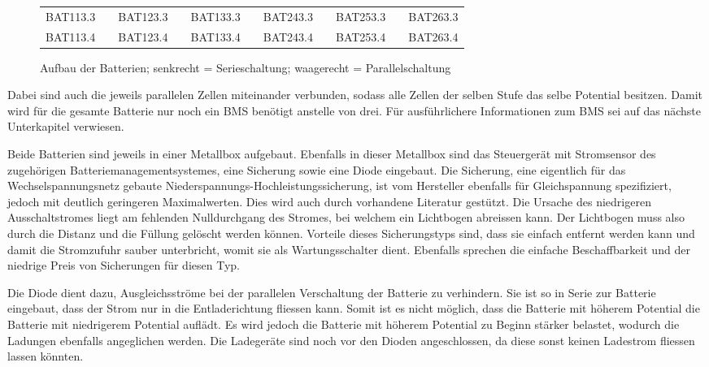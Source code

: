 \begin{figure}[h]
\begin{tabular}{lp{2mm}lp{2mm}lp{1.5cm}lp{2mm}lp{2mm}l}
\multicolumn{1}{|l|}{BAT113.3} & \multicolumn{1}{l|}{} & \multicolumn{1}{l|}{BAT123.3} & \multicolumn{1}{l|}{} & \multicolumn{1}{l|}{BAT133.3} & \multicolumn{1}{l|}{} & \multicolumn{1}{l|}{BAT243.3} & \multicolumn{1}{l|}{} & \multicolumn{1}{l|}{BAT253.3} & \multicolumn{1}{l|}{} & \multicolumn{1}{l|}{BAT263.3} \\ \cline{1-1} \cline{3-3} \cline{5-5} \cline{7-7} \cline{9-9} \cline{11-11} 
\multicolumn{1}{|l|}{BAT113.4} & \multicolumn{1}{l|}{} & \multicolumn{1}{l|}{BAT123.4} & \multicolumn{1}{l|}{} & \multicolumn{1}{l|}{BAT133.4} & \multicolumn{1}{l|}{} & \multicolumn{1}{l|}{BAT243.4} & \multicolumn{1}{l|}{} & \multicolumn{1}{l|}{BAT253.4} & \multicolumn{1}{l|}{} & \multicolumn{1}{l|}{BAT263.4} \\ \cline{1-1} \cline{3-3} \cline{5-5} \cline{7-7} \cline{9-9} \cline{11-11} 
\end{tabular}
	\caption{Aufbau der Batterien; senkrecht = Serieschaltung; waagerecht = Parallelschaltung}
	\label{fig:schema_batterie}
\end{figure}

Dabei sind auch die jeweils parallelen Zellen miteinander verbunden, sodass alle Zellen der selben Stufe das selbe Potential besitzen. Damit wird für die gesamte Batterie nur noch ein BMS benötigt anstelle von drei. Für ausführlichere Informationen zum BMS sei auf das nächste Unterkapitel verwiesen.

Beide Batterien sind jeweils in einer Metallbox aufgebaut. Ebenfalls in dieser Metallbox sind das Steuergerät mit Stromsensor des zugehörigen Batteriemanagementsystemes, eine Sicherung sowie eine Diode eingebaut. Die Sicherung, eine eigentlich für das Wechselspannungsnetz gebaute Niederspannungs-Hochleistungssicherung, ist vom Hersteller ebenfalls für Gleichspannung spezifiziert, jedoch mit deutlich geringeren Maximalwerten. Dies wird auch durch vorhandene Literatur \cite{siba} gestützt. Die Ursache des niedrigeren Ausschaltstromes liegt am fehlenden Nulldurchgang des Stromes, bei welchem ein Lichtbogen abreissen kann. Der Lichtbogen muss also durch die Distanz und die Füllung gelöscht werden können. Vorteile dieses Sicherungstyps sind, dass sie einfach entfernt werden kann und damit die Stromzufuhr sauber unterbricht, womit sie als Wartungsschalter dient. Ebenfalls sprechen die einfache Beschaffbarkeit und der niedrige Preis von Sicherungen für diesen Typ.

Die Diode dient dazu, Ausgleichsströme bei der parallelen Verschaltung der Batterie zu verhindern. Sie ist so in Serie zur Batterie eingebaut, dass der Strom nur in die Entladerichtung fliessen kann. Somit ist es nicht möglich, dass die Batterie mit höherem Potential die Batterie mit niedrigerem Potential auflädt. Es wird jedoch die Batterie mit höherem Potential zu Beginn stärker belastet, wodurch die Ladungen ebenfalls angeglichen werden. Die Ladegeräte sind noch vor den Dioden angeschlossen, da diese sonst keinen Ladestrom fliessen lassen könnten.

